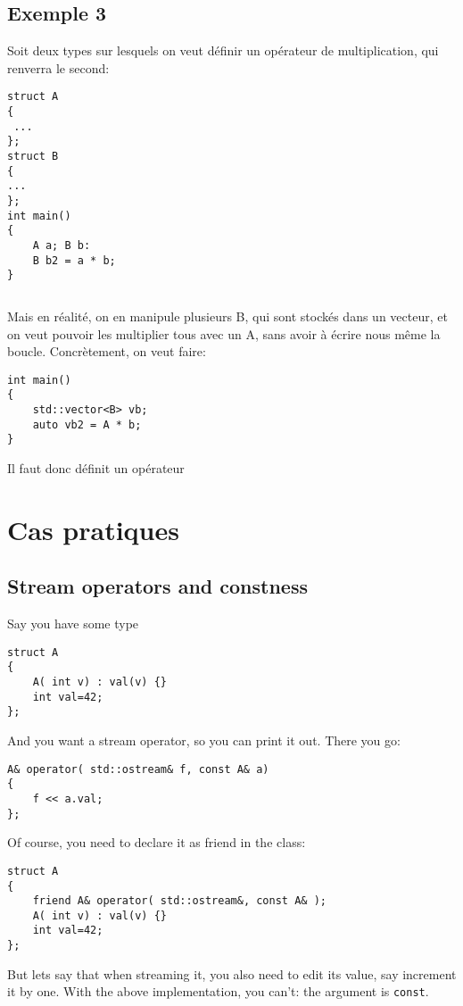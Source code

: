 \documentclass[11pt,a4paper]{article}
\begin{document}
\subsection{Exemple 3}

Soit deux types sur lesquels on veut définir un opérateur de multiplication, qui renverra le second:
\begin{lstlisting}
struct A
{
 ...
};
struct B
{
...
};
int main()
{
	A a; B b:
	B b2 = a * b;
}
\end{lstlisting}

\begin{lstlisting}
\end{lstlisting}


Mais en réalité, on en manipule plusieurs B, qui sont stockés dans un vecteur, et on veut pouvoir les multiplier tous avec un A, sans avoir à écrire nous même la boucle.
Concrètement, on veut faire:
\begin{lstlisting}
int main()
{
	std::vector<B> vb;
	auto vb2 = A * b;
}
\end{lstlisting}

Il faut donc définit un opérateur

\section{Cas pratiques}

\subsection{Stream operators and constness}

Say you have some type
\begin{lstlisting}
struct A
{
	A( int v) : val(v) {}
	int val=42;
};
\end{lstlisting}

And you want a stream operator, so you can print it out.
There you go:

\begin{lstlisting}
A& operator( std::ostream& f, const A& a)
{
	f << a.val;
};
\end{lstlisting}

Of course, you need to declare it as friend in the class:
\begin{lstlisting}
struct A
{
	friend A& operator( std::ostream&, const A& );
	A( int v) : val(v) {}
	int val=42;
};
\end{lstlisting}

But lets say that when streaming it, you also need to edit its value, say increment it by one.
With the above implementation, you can't: the argument is {\tt const}.
\end{document}
